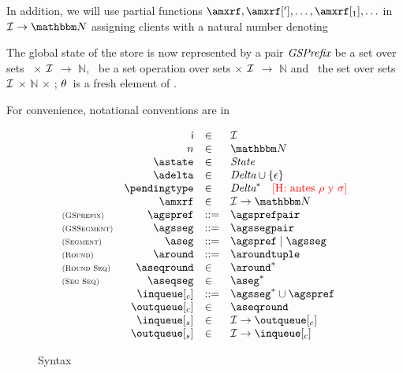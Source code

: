 \documentclass[envcountsect,runningheads,orivec]{llncs}
\begin{document}
In addition,  we will use partial functions  $\amxrf,\amxrf['],\ldots, \amxrf[{_1}],\ldots$ in  $\idset\rightarrow \nat$
assigning clients with a natural number denoting 


The global state of the store is now represented by a pair $\textit{GSPrefix}$ be a set over sets \statetype\ $\times$ $\mathcal{\mathcal{I}}$ $\rightarrow$ $\mathbb{N}$, \gssegmenttype\ be a set operation over sets \deltatype $\times$ $\mathcal{\mathcal{I}}$ $\rightarrow$ $\mathbb{N}$ and \roundtype\ the set over sets $\mathcal{\mathcal{I}}$ $\times$ $\mathbb{N}$ $\times$ \deltatype; $\theta$\ is a fresh element of \gssegmenttype.
%

For convenience, notational conventions are in~\figref{}
\begin{figure}
  \[
   \begin{array}{lrll}
       & \cid & \in & \idset
       \\
       & n & \in & \nat
       \\
       &\astate & \in & \statetype
       \\
       &\adelta & \in & \deltatype \cup \{\epsilon\}
       \\
       &\pendingtype & \in & \deltatype^* \quad \mbox{\henote{antes $\rho$ y $\sigma$}}\\
       &\amxrf & \in & \idset\rightarrow \nat
       \\
       \rName{GSprefix}
       &
       \agspref & ::= & \agsprefpair
       \\
       \rName{GSSegment}
       &
       \agsseg & ::= & \agssegpair
       \\
       \rName{Segment}
       &
       \aseg & ::= & \agspref \; |\;  \agsseg
        \\
       \rName{Round}
       &
       \around &::= & \aroundtuple
        \\
       \rName{Round Seq}
       &
       \aseqround &\in & \around^*
        \\
       \rName{Seg Seq}
       &
       \aseqseg &\in & \aseg^*
        \\
       &
       {\inclient} &::= &  {{\agsseg}^* \cup \agspref}
       \\
       & 
       \outclient &\in & {\aseqround}
      \\
       &
       {\inserver} & \in  & \partialfunction{\idset}\outclient
       \\
       & 
       \outserver &\in & \partialfunction{\idset}\inclient
   \end{array}
  \]
  \caption{Syntax}
  \label{fig:syntax-implementation}
\end{figure}
\end{document}

